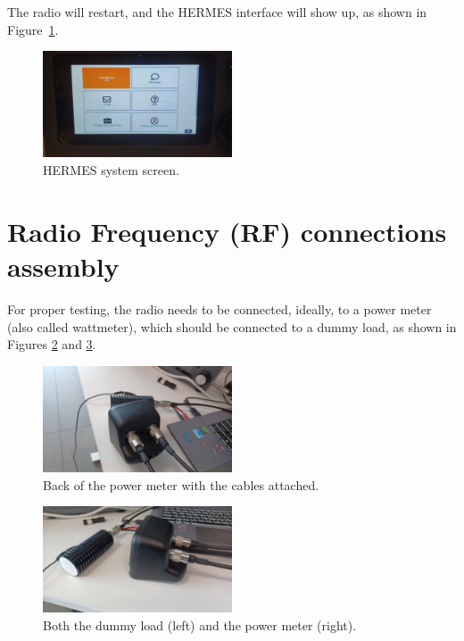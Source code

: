 \documentclass[11pt,a4paper]{article}
\begin{document}
The radio will restart, and the HERMES interface will show up, as shown in Figure~\ref{fig:inst8}.

\begin{figure}[H]
  \centering
  \includegraphics[width=0.5\textwidth]{pictures/inst-8.jpg}
  \caption{HERMES system screen.}
  \label{fig:inst8}
\end{figure}








\section{Radio Frequency (RF) connections assembly}

For proper testing, the radio needs to be connected, ideally, to a power meter (also called wattmeter), which should be connected to a dummy load, as shown in Figures \ref{fig:backview1} and \ref{fig:backview3}.

\begin{figure}[H]
  \centering
  \includegraphics[width=0.5\textwidth]{pictures/wattmeter_1.jpeg}
  \caption{Back of the power meter with the cables attached.}
  \label{fig:backview1}
\end{figure}

\begin{figure}[H]
  \centering
  \includegraphics[width=0.5\textwidth]{pictures/wattmeter_3.jpeg}
  \caption{Both the dummy load (left) and the power meter (right).}
  \label{fig:backview3}
\end{figure}
\end{document}
